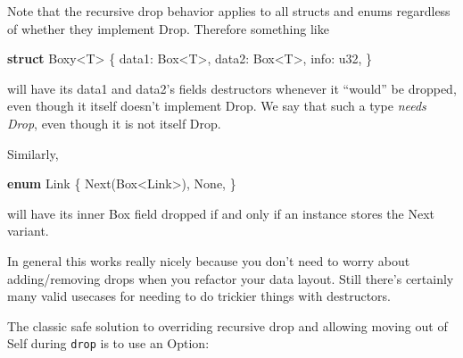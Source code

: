 \documentclass[a4paper,]{book}
\newenvironment{Shaded}{\begin{snugshade}}{\end{snugshade}}
\newcommand{\KeywordTok}[1]{\textcolor[rgb]{0.13,0.29,0.53}{\textbf{{#1}}}}
\newcommand{\DataTypeTok}[1]{\textcolor[rgb]{0.13,0.29,0.53}{{#1}}}
\newcommand{\ConstantTok}[1]{\textcolor[rgb]{0.00,0.00,0.00}{{#1}}}
\newcommand{\NormalTok}[1]{{#1}}
\begin{document}
Note that the recursive drop behavior applies to all structs and enums
regardless of whether they implement Drop. Therefore something like

\begin{Shaded}
\begin{Highlighting}[]
\KeywordTok{struct} \NormalTok{Boxy<T> \{}
    \NormalTok{data1: }\DataTypeTok{Box}\NormalTok{<T>,}
    \NormalTok{data2: }\DataTypeTok{Box}\NormalTok{<T>,}
    \NormalTok{info: }\DataTypeTok{u32}\NormalTok{,}
\NormalTok{\}}
\end{Highlighting}
\end{Shaded}

will have its data1 and data2's fields destructors whenever it ``would''
be dropped, even though it itself doesn't implement Drop. We say that
such a type \emph{needs Drop}, even though it is not itself Drop.

Similarly,

\begin{Shaded}
\begin{Highlighting}[]
\KeywordTok{enum} \NormalTok{Link \{}
    \NormalTok{Next(}\DataTypeTok{Box}\NormalTok{<Link>),}
    \ConstantTok{None}\NormalTok{,}
\NormalTok{\}}
\end{Highlighting}
\end{Shaded}

will have its inner Box field dropped if and only if an instance stores
the Next variant.

In general this works really nicely because you don't need to worry
about adding/removing drops when you refactor your data layout. Still
there's certainly many valid usecases for needing to do trickier things
with destructors.

The classic safe solution to overriding recursive drop and allowing
moving out of Self during \texttt{drop} is to use an Option:
\end{document}
